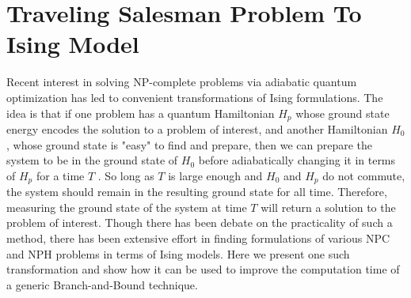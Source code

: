 
\section{Traveling Salesman Problem To Ising Model}
	Recent interest in solving NP-complete problems via adiabatic quantum optimization has led to convenient transformations of Ising formulations. 
	The idea is that if one problem has a quantum Hamiltonian $H_p$ whose ground state energy encodes the solution to a problem of interest, and another Hamiltonian $H_0$, whose ground state is "easy" to find and prepare, then we can prepare the system to be in the ground state of $H_0$ before adiabatically changing it in terms of $H_p$ for a time $T$ \cite{lucas2014ising}. 
	So long as $T$ is large enough and $H_0$ and $H_p$ do not commute, the system should remain in the resulting ground state for all time. 
	Therefore, measuring the ground state of the system at time $T$ will return a solution to the problem of interest. 
	Though there has been debate on the practicality of such a method, there has been extensive effort in finding formulations of various NPC and NPH problems in terms of Ising models. 
	Here we present one such transformation and show how it can be used to improve the computation time of a generic Branch-and-Bound technique. 
	
	
	
	
	
